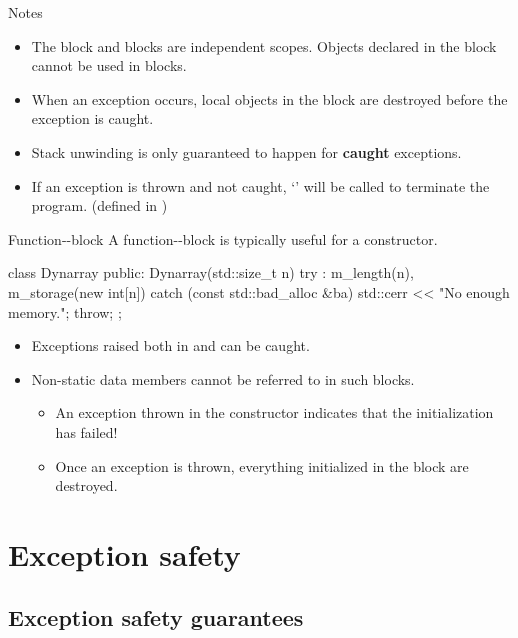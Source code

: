 \documentclass[aspectratio=169]{beamer}
\begin{document}
\begin{frame}[fragile]{Notes}
  \begin{itemize}
    \item The  block and  blocks are independent scopes. Objects declared in the  block cannot be used in  blocks.
    \item When an exception occurs, local objects in the  block are destroyed before the exception is caught.
    \item Stack unwinding is only guaranteed to happen for \textbf{caught} exceptions.
    \item If an exception is thrown and not caught, `' will be called to terminate the program. (defined in )
  \end{itemize}
\end{frame}

\begin{frame}[fragile]{Function--block}
  A function--block is typically useful for a constructor.
  \begin{cpp}
    class Dynarray {
    public:
      Dynarray(std::size_t n)
          try : m_length(n), m_storage(new int[n]{}) {}
      catch (const std::bad_alloc &ba) {
        std::cerr << "No enough memory.\n";
        throw;
      }
    };
  \end{cpp}
  \begin{itemize}
    \item Exceptions raised both in  and  can be caught.
    \item Non-static data members cannot be referred to in such  blocks. 
    \pause
    \begin{itemize}
      \item An exception thrown in the constructor indicates that the initialization has failed!
      \item Once an exception is thrown, everything initialized in the  block are destroyed.
    \end{itemize}
  \end{itemize}
\end{frame}

\section{Exception safety}

\subsection{Exception safety guarantees}
\end{document}

